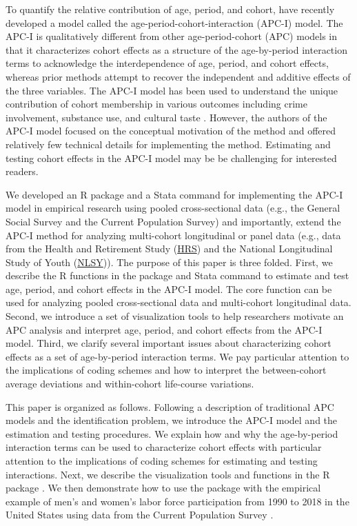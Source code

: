 To quantify the relative contribution of age, period, and cohort, \citet{luo_age-period-cohort-interaction_2020} have recently developed a model called the age-period-cohort-interaction (APC-I) model. The APC-I is qualitatively different from other age-period-cohort (APC) models in that it characterizes cohort effects as a structure of the age-by-period interaction terms to acknowledge the interdependence of age, period, and cohort effects, whereas prior methods attempt to recover the independent and additive effects of the three variables. The APC-I model has been used to understand the unique contribution of cohort membership in various outcomes including crime involvement, substance use, and cultural taste \citep{lu_cohort_2020, verdery_visualizing_2020, ma_what_2020}. However, the authors of the APC-I model focused on the conceptual motivation of the method and offered relatively few technical details for implementing the method.  Estimating and testing cohort effects in the APC-I model may be be challenging for interested readers.  

We developed an R package  \citep{apci} and a Stata command  for implementing the APC-I model in empirical research using pooled cross-sectional data (e.g., the General Social Survey and the Current Population Survey) and importantly, extend the APC-I method for analyzing multi-cohort longitudinal or panel data (e.g., data from the Health and Retirement Study (\hyperlink{https://hrs.isr.umich.edu/about}{HRS}) and the National Longitudinal Study of Youth (\hyperlink{https://www.bls.gov/nls/}{NLSY})). The purpose of this paper is three folded. First, we describe the R functions in the  package and Stata command to estimate and test age, period, and cohort effects in the APC-I model.  The core function can be used for analyzing pooled cross-sectional data and multi-cohort longitudinal data.  Second, we introduce a set of visualization tools to help researchers motivate an APC analysis and interpret age, period, and cohort effects from the APC-I model.  Third, we clarify several important issues about characterizing cohort effects as a set of age-by-period interaction terms. We pay particular attention to the implications of coding schemes and how to interpret the between-cohort average deviations and within-cohort life-course variations. 

This paper is organized as follows. Following a description of traditional APC models and the identification problem, we introduce the APC-I model and the estimation and testing procedures.  We explain how and why the age-by-period interaction terms can be used to characterize cohort effects with particular attention to the implications of coding schemes for estimating and testing interactions.  Next, we describe the visualization tools and functions in the R package .  We then demonstrate how to use the package with the empirical example of men's and women's labor force participation from 1990 to 2018 in the United States using data from the Current Population Survey \citep[\hyperlink{https://www.census.gov/programs-surveys/cps/data.html}{CPS,}][]{cps_citation}.

